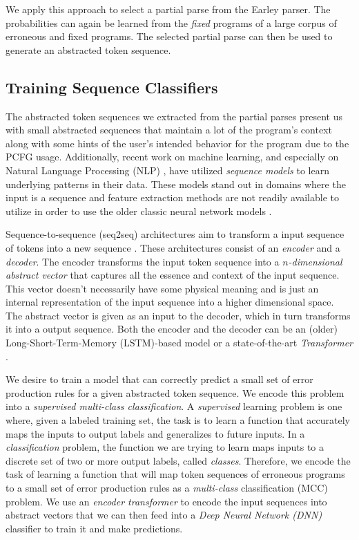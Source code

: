 We apply this approach to select a partial parse from the Earley parser. The
probabilities can again be learned from the \emph{fixed} programs of a large
corpus of erroneous and fixed programs. The selected partial parse can then be
used to generate an abstracted token sequence.


\subsection{Training Sequence Classifiers}
\label{sec:overview:train}
The abstracted token sequences we extracted from the partial parses present us
with small abstracted sequences that maintain a lot of the program's context
along with some hints of the user's intended behavior for the program due to the
PCFG usage. Additionally, recent work on machine learning, and especially on
Natural Language Processing (NLP) \citep{?}, have utilized \emph{sequence
models} to learn underlying patterns in their data. These models stand out in
domains where the input is a sequence and feature extraction methods are not
readily available to utilize in order to use the older classic neural network
models \citep{?}.

 Sequence-to-sequence (seq2seq) architectures aim to
transform a input sequence of tokens into a new sequence \citep{?}. These
architectures consist of an \emph{encoder} and a \emph{decoder}. The encoder
transforms the input token sequence into a \emph{$n$-dimensional abstract
vector} that captures all the essence and context of the input sequence. This
vector doesn't necessarily have some physical meaning and is just an internal
representation of the input sequence into a higher dimensional space. The
abstract vector is given as an input to the decoder, which in turn transforms it
into a output sequence. Both the encoder and the decoder can be an (older)
Long-Short-Term-Memory (LSTM)-based model \citep{?} or a state-of-the-art
\emph{Transformer} \citep{?}.

 We desire to train a model that can correctly
predict a small set of error production rules for a given abstracted token
sequence. We encode this problem into a \emph{supervised multi-class
classification}. A \emph{supervised} learning problem is one where, given a
labeled training set, the task is to learn a function that accurately maps the
inputs to output labels and generalizes to future inputs. In a
\emph{classification} problem, the function we are trying to learn maps inputs
to a discrete set of two or more output labels, called \emph{classes}.
Therefore, we encode the task of learning a function that will map token
sequences of erroneous programs to a small set of error production rules as a
\emph{multi-class} classification (MCC) problem. We use an \emph{encoder
transformer} to encode the input sequences into abstract vectors that we can
then feed into a \emph{Deep Neural Network (DNN)} classifier to train it and
make predictions.


